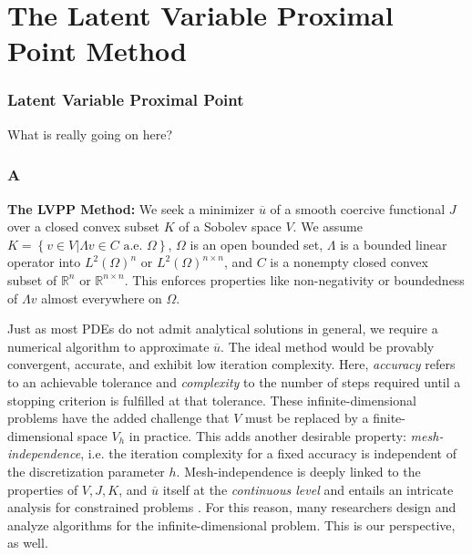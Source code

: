 \documentclass[aspectratio=169,xcolor=dvipsnames,11pt]{beamer}
\begin{document}
\section{The Latent Variable Proximal Point Method}
\begin{frame}\frametitle{Latent Variable Proximal Point}
{\Large
{\color{Maroon}
What is really going on here?
}
}
\end{frame}

\begin{frame}\frametitle{A}

{\color{BlueViolet}\textbf{The LVPP Method:}} We seek a minimizer $\overline{u}$ of a smooth coercive functional $J$ over a closed convex subset $K$ of a Sobolev space $V$. We assume $K = \left\{v \in V \left| \Lambda v \in C \text{ a.e. } \Omega \right.\right\}$, $\Omega$ is an open bounded set, $\Lambda$ is a bounded linear operator into $L^2(\Omega)^n$ or $L^2(\Omega)^{n\times n}$, and $C$ is a nonempty closed convex subset of $\mathbb R^n$ or $\mathbb R^{n \times n}$. This enforces properties like non-negativity or boundedness of $\Lambda v$ almost everywhere on $\Omega$. 

Just as most PDEs do not admit analytical solutions in general, we require a numerical algorithm to approximate $\overline{u}$. The ideal method would be provably convergent, accurate, and exhibit low iteration complexity. Here, \textit{accuracy} refers to an achievable tolerance and \textit{complexity} to the number of steps required until a stopping criterion is fulfilled at that tolerance.  These infinite-dimensional problems have the added challenge that $V$ must be replaced by a finite-dimensional space $V_h$ in practice. This adds another desirable property: \textit{mesh-independence}, i.e. the iteration complexity for a fixed accuracy is independent of the discretization parameter $h$. Mesh-independence is deeply linked to the properties of $V,J,K$, and $\overline{u}$ itself at the \emph{continuous level} \cite{MWeiser_etal_2005} and entails an intricate analysis for constrained problems \cite{Hintermller2004}. For this reason, many researchers design and analyze algorithms for the infinite-dimensional problem. This is our perspective, as well.


\end{frame}
\end{document}
